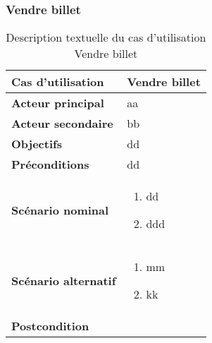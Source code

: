         \subsubsection[Vendre billet]{Vendre billet}
        \begin{longtable}{p{4cm} p{9cm}}
            \caption{Description textuelle du cas d’utilisation Vendre billet}
            \label{table:usecaseVendreBill}
            \\\hline\hline
                \textbf{Cas d’utilisation} & \textbf{Vendre billet}
            \\\hline\hline
                    \textbf{Acteur principal} & aa
                \\
                    \textbf{Acteur secondaire} & bb
                \\
                    \textbf{Objectifs} & dd
                \\
                    \textbf{Préconditions} & dd
                \\
                \textbf{Scénario nominal} &
                    \begin{enumerate}[leftmargin=*]
                        \item dd
                        \item ddd
                    \end{enumerate}
                \\
                \textbf{Scénario alternatif} &
                    \begin{enumerate}[leftmargin=*]
                        \item mm
                        \item kk
                    \end{enumerate}
                \\
                \textbf{Postcondition}
            \\\bottomrule
        \end{longtable}

